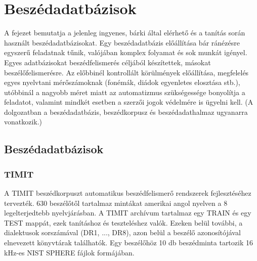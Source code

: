 \chapter{Beszédadatbázisok}

A fejezet bemutatja a jelenleg ingyenes, bárki által elérhető és a tanítás során használt beszédadatbázisokat. Egy beszédadatbázis előállítása bár ránézésre egyszerű feladatnak tűnik,
valójában komplex folyamat és sok munkát igényel. Egyes adatbázisokat beszédfelismerés céljából készítettek, másokat beszélőfelismerésre. Az előbbinél kontrollált körülmények előállítása, megfelelés egyes nyelvtani mérőszámoknak (fonémák, diádok egyenletes elosztása stb.), utóbbinál a nagyobb méret miatt az automatizmus szükségessége bonyolítja a feladatot, valamint mindkét esetben a szerzői jogok védelmére is ügyelni kell. (A dolgozatban a beszédadatbázis, beszédkorpusz és beszédadathalmaz ugyanarra vonatkozik.)

\section{Beszédadatbázisok}

\subsection{TIMIT}

A TIMIT beszédkorpuszt automatikus beszédfelismerő rendszerek fejlesztéséhez tervezték. 630 beszélőtől tartalmaz mintákat amerikai angol nyelven a 8 legelterjedtebb nyelvjárásban.
A TIMIT archívum tartalmaz egy TRAIN és egy TEST mappát, ezek tanításhoz és teszteléshez valók. Ezeken belül további, a dialektusok sorszámával (DR1, ..., DR8), azon belül a beszélő azonosítójával elnevezett könyvtárak találhatók. Egy beszélőhöz
10 db beszédminta tartozik 16 kHz-es NIST SPHERE fájlok formájában.


